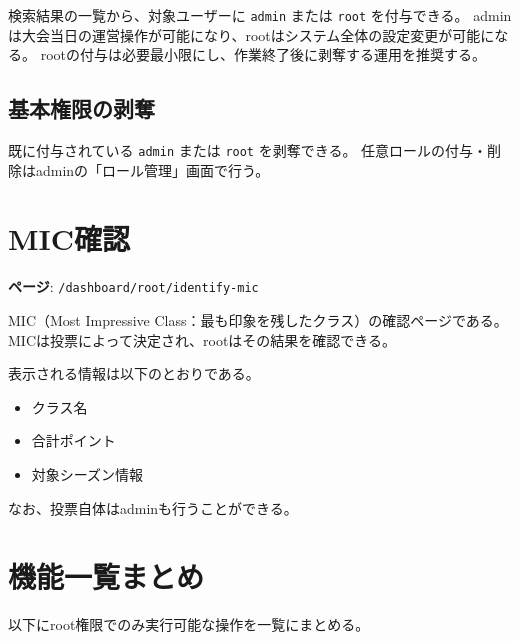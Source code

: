\documentclass[12pt]{ltjsarticle}
\newcommand{\code}[1]{\colorbox{gray!20}{\texttt{#1}}}
\begin{document}
検索結果の一覧から、対象ユーザーに \code{admin} または \code{root} を付与できる。
adminは大会当日の運営操作が可能になり、rootはシステム全体の設定変更が可能になる。
rootの付与は必要最小限にし、作業終了後に剥奪する運用を推奨する。

\subsection{基本権限の剥奪}

既に付与されている \code{admin} または \code{root} を剥奪できる。
任意ロールの付与・削除はadminの「ロール管理」画面で行う。

\newpage

\section{MIC確認}

\textbf{ページ}: \code{/dashboard/root/identify-mic}

MIC（Most Impressive Class：最も印象を残したクラス）の確認ページである。
MICは投票によって決定され、rootはその結果を確認できる。

表示される情報は以下のとおりである。

\begin{itemize}
  \item クラス名
  \item 合計ポイント
  \item 対象シーズン情報
\end{itemize}

なお、投票自体はadminも行うことができる。

\newpage

\section{機能一覧まとめ}

以下にroot権限でのみ実行可能な操作を一覧にまとめる。
\end{document}
